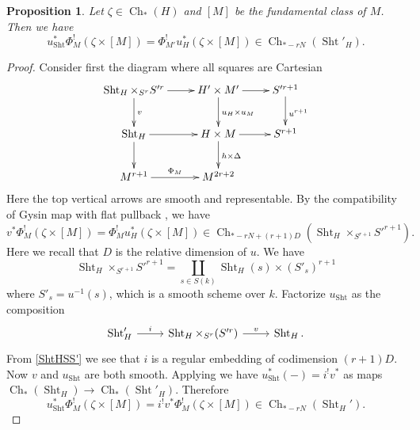 \documentclass[reqno]{amsart}
\numberwithin{equation}{section}
\newcommand\mnote[1]{\marginpar{\tiny #1}}
\DeclareMathOperator{\Sht}{Sht}
\DeclareMathOperator{\Ch}{Ch}
\newcommand{\z}{\zeta}
\newtheorem{prop}[thm]{Proposition}
\theoremstyle{remark}
\numberwithin{equation}{section}
\begin{document}
\begin{prop}\label{p:base change}  Let $\z\in \Ch_{*}(H)$ and $[M]$ be the fundamental class of $M$. Then we have
\begin{equation}
u_{\Sht}^{*}\Phi_{M}^{!}(\z \times [M])=\Phi_{M'}^{!}u_{H}^{*}(\z \times [M])\in\Ch_{*-rN}(\Sht'_{H}).
\end{equation}
\end{prop}
\begin{proof}
Consider first the diagram where all squares are Cartesian
\begin{equation}
\xymatrix{\Sht_{H}\times_{S^{r}}S'^{r}\ar[r]\ar[d]^{v} & H' \times M' \ar[r]\ar[d]^{u_{H} \times u_M} & S'^{r+1}\ar[d]^{u^{r+1}}\\
\Sht_{H}\ar[r]\ar[d] & H \times M \ar[r]\ar[d]^{h \times \Delta} & S^{r+1}\\
M^{r+1}\ar[r]^-{\Phi_{M}} & M^{2r+2}
}
\end{equation}
Here the top vertical arrows are smooth and representable. By the compatibility of  Gysin map with flat pullback \cite[Theorem 2.1.12(ix)]{Kr99}, we have
\begin{equation}\label{vPhiu}
v^{*}\Phi_{M}^{!}(\z \times [M])=\Phi_{M}^{!}u_{H}^{*}(\z \times [M])\in \Ch_{*-rN+(r+1)D}(\Sht_{H}\times_{S^{r+1}}S'^{r+1}).
\end{equation}
Here we recall that $D$ is the relative dimension of $u$.
We have
\begin{equation}\label{ShtHSS'}
\Sht_{H}\times_{S^{r+1}}S'^{r+1}=\coprod_{s\in S(k)}\Sht_{H}(s)\times (S'_{s})^{r+1}
\end{equation}
where $S'_{s}=u^{-1}(s)$, which is a smooth scheme over $k$. Factorize $u_{\Sht}$ as the composition
\begin{equation}
\begin{tikzcd}
\Sht'_{H} \ar[r, "{i}"] & \Sht_{H}\times_{S^{r}}(S'^{r}) \ar[r, "v"]  & \Sht_{H}.
\end{tikzcd}
\end{equation}
From \eqref{ShtHSS'} we see that $i$ is a regular embedding of codimension $(r+1)D$. Now $v$ and $u_{\Sht}$ are both smooth. Applying \cite[Theorem 2.1.12(ix)]{Kr99} we have $u^{*}_{\Sht}(-)=i^{!}v^{*}$ as maps $\Ch_{*}(\Sht_{H})\to \Ch_*(\Sht'_{H})$. Therefore
\begin{equation}\label{iuPhi}
u_{\Sht}^{*}\Phi_{M}^{!}(\z \times [M])=i^{!}v^{*}\Phi_{M}^{!}(\z \times [M])\in \Ch_{*-rN}(\Sht_{H}').

\end{equation}
\end{proof}
\end{document}

